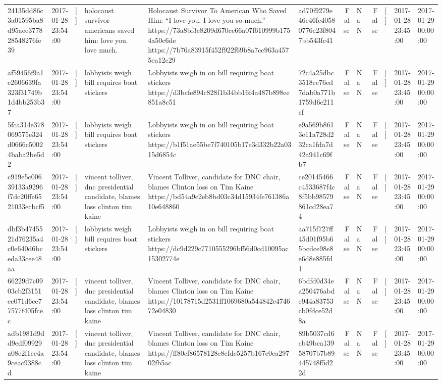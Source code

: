 \begin{tabular}{llllllrlrlll}
24135dd86c3a01595ba8d95aee377828548276fe39 & 2017-01-28 23:54:00 & [] & holocaust survivor americans saved him: love you. love much. & Holocaust Survivor To American Who Saved Him: “I love you. I love you so much.” https://73a8bf3e8209d670ce66a07f610999b1754a50c6de https://7b76a83915f452f922f69b8a7cc963a4575ea12c29 & ad70f9279e46c46fc40580776c23f8047bb543fc41 & False & NaN & False & [] & 2017-01-28 23:45:00 & 2017-01-29 00:00:00 \\
af59456f9a1e2606639fa323f31749b1d4bb253b37 & 2017-01-28 23:54:00 & [] & lobbyists weigh bill requires boat stickers & Lobbyists weigh in on bill requiring boat stickers https://d3bcfe894c828f1b34bb16f4a487b898ee851a8c51 & 72c4a25dbc3518ee76ed7dab0a771b1759d6e211cf & False & NaN & False & [] & 2017-01-28 23:45:00 & 2017-01-29 00:00:00 \\
5fca314e378069575e324d0666c50024baba2be5d2 & 2017-01-28 23:54:00 & [] & lobbyists weigh bill requires boat stickers & Lobbyists weigh in on bill requiring boat stickers https://b1f51ae55be7f740105b17e3d332b22a0315d6854c & e9a569b8613e11a728d232ca1fda7d42a941c69fb7 & False & NaN & False & [] & 2017-01-28 23:45:00 & 2017-01-29 00:00:00 \\
c919e5c00639133a9296f7dc20ffe6521033ecbcf5 & 2017-01-28 23:54:00 & [] & vincent tolliver, dnc presidential candidate, blames loss clinton tim kaine & Vincent Tolliver, candidate for DNC chair, blames Clinton loss on Tim Kaine https://bd54a9c2eb8bd03c34d15934fe761386a10e648860 & ce20145466c4533687f4c8f5bb98579861cd28ea74 & False & NaN & False & [] & 2017-01-28 23:45:00 & 2017-01-29 00:00:00 \\
dbf3b4745521d76235a4c0e640d6bceda33cee48aa & 2017-01-28 23:54:00 & [] & lobbyists weigh bill requires boat stickers & Lobbyists weigh in on bill requiring boat stickers https://dc9d229c7710555296bf56d0cd10095ac15302774e & aa715f727ff45d01f95b65bcdce98e8e6d8e885fd1 & False & NaN & False & [] & 2017-01-28 23:45:00 & 2017-01-29 00:00:00 \\
66229d7c0903cb2f3151ec071d6ce77577f405fcec & 2017-01-28 23:54:00 & [] & vincent tolliver, dnc presidential candidate, blames loss clinton tim kaine & Vincent Tolliver, candidate for DNC chair, blames Clinton loss on Tim Kaine https://10178715d2531ff1069680a544842e474672e04830 & 6bdfd0d34ea250476abde944a83753cb0fdce52d8a & False & NaN & False & [] & 2017-01-28 23:45:00 & 2017-01-29 00:00:00 \\
adb1981d9dd9edf09929a08e2f1ce4a9ceac9388cd & 2017-01-28 23:54:00 & [] & vincent tolliver, dnc presidential candidate, blames loss clinton tim kaine & Vincent Tolliver, candidate for DNC chair, blames Clinton loss on Tim Kaine https://ff80cf86578128e8cfde5257b167e0ca29702fb5ac & 89b5037cd6cb49bca13958707b7b89445748f5d22d & False & NaN & False & [] & 2017-01-28 23:45:00 & 2017-01-29 00:00:00 \\

\end{tabular}
